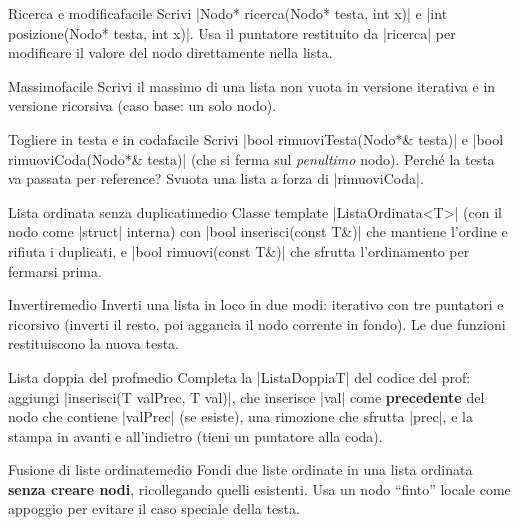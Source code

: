 \begin{esercizio}{Ricerca e modifica}{facile}
Scrivi \cc|Nodo* ricerca(Nodo* testa, int x)| e \cc|int posizione(Nodo* testa, int x)|.
Usa il puntatore restituito da \cc|ricerca| per modificare il valore del nodo
direttamente nella lista.
\end{esercizio}

\begin{esercizio}{Massimo}{facile}
Scrivi il massimo di una lista non vuota in versione iterativa e in versione ricorsiva
(caso base: un solo nodo).
\end{esercizio}

\begin{esercizio}{Togliere in testa e in coda}{facile}
Scrivi \cc|bool rimuoviTesta(Nodo*& testa)| e \cc|bool rimuoviCoda(Nodo*& testa)| (che
si ferma sul \emph{penultimo} nodo). Perché la testa va passata per reference? Svuota una
lista a forza di \cc|rimuoviCoda|.
\end{esercizio}

\begin{esercizio}{Lista ordinata senza duplicati}{medio}
Classe template \cc|ListaOrdinata<T>| (con il nodo come \cc|struct| interna) con
\cc|bool inserisci(const T&)| che mantiene l'ordine e rifiuta i duplicati, e
\cc|bool rimuovi(const T&)| che sfrutta l'ordinamento per fermarsi prima.
\end{esercizio}

\begin{esercizio}{Invertire}{medio}
Inverti una lista in loco in due modi: iterativo con tre puntatori e ricorsivo
(inverti il resto, poi aggancia il nodo corrente in fondo). Le due funzioni
restituiscono la nuova testa.
\end{esercizio}

\begin{esercizio}{Lista doppia del prof}{medio}
Completa la \cc|ListaDoppiaT| del codice del prof: aggiungi \cc|inserisci(T valPrec, T val)|,
che inserisce \cc|val| come \textbf{precedente} del nodo che contiene \cc|valPrec| (se
esiste), una rimozione che sfrutta \cc|prec|, e la stampa in avanti e all'indietro
(tieni un puntatore alla coda).
\end{esercizio}

\begin{esercizio}{Fusione di liste ordinate}{medio}
Fondi due liste ordinate in una lista ordinata \textbf{senza creare nodi}, ricollegando
quelli esistenti. Usa un nodo ``finto'' locale come appoggio per evitare il caso speciale
della testa.
\end{esercizio}

